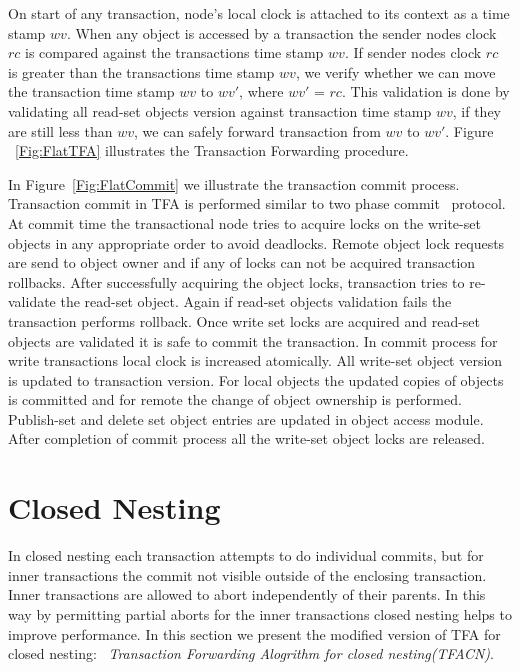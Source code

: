 \documentclass[12pt,english]{report}
\begin{document}
On start of any transaction, node's local clock is attached to its context as a time stamp $wv$. When any object is accessed by a transaction the sender nodes clock $rc$ is compared against the transactions time stamp $wv$. If sender nodes clock $rc$ is greater than the transactions time stamp $wv$, we verify whether we can move the transaction time stamp $wv$ to $wv'$, where $wv'$ = $rc$. This validation is done by validating all read-set objects version against transaction time stamp $wv$, if they are still less than $wv$, we can safely forward transaction from $wv$ to $wv'$. Figure ~\ref{Fig:FlatTFA} illustrates the Transaction Forwarding procedure.

In Figure~\ref{Fig:FlatCommit} we illustrate the transaction commit process. Transaction commit in TFA is performed similar to two phase commit~\cite{TwoPC:weikum1991principles} protocol. At commit time the transactional node tries to acquire locks on the write-set objects in any appropriate order to avoid deadlocks. Remote object lock requests are send to object owner and if any of locks can not be acquired transaction rollbacks. After successfully acquiring the object locks, transaction tries to re-validate the read-set object. Again if read-set objects validation fails the transaction performs rollback. Once write set locks are acquired and read-set objects are validated it is safe to commit the transaction. In commit process for write transactions local clock is increased atomically. All write-set object version is updated to transaction version. For local objects the updated copies of objects is committed and for remote the change of object ownership is performed. Publish-set and delete set object entries are updated in object access module. After completion of commit process all the write-set object locks are released. 
   
\section{Closed Nesting} 

In closed nesting each transaction attempts to do individual commits, but for inner transactions the commit not visible outside of the enclosing transaction. Inner transactions are allowed to abort independently of their parents. In this way by permitting partial aborts for the inner transactions closed nesting helps to improve performance. In this section we present the modified version of TFA for closed nesting: ~\emph{Transaction Forwarding Alogrithm for closed nesting(TFACN)}.
\end{document}
